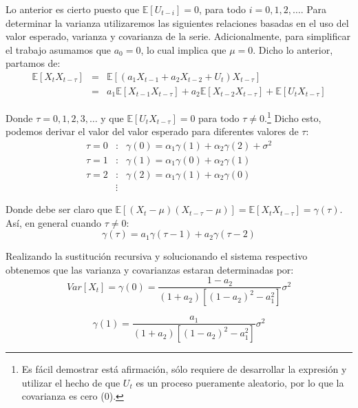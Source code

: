 \documentclass[
]{book}
\begin{document}
Lo anterior es cierto puesto que \(\mathbb{E}[U_{t - i}] = 0\), para todo \(i = 0, 1, 2, \ldots\). Para determinar la varianza utilizaremos las siguientes relaciones basadas en el uso del valor esperado, varianza y covarianza de la serie. Adicionalmente, para simplificar el trabajo asumamos que \(a_0 = 0\), lo cual implica que \(\mu = 0\). Dicho lo anterior, partamos de:
\begin{eqnarray*}
    \mathbb{E}[X_t X_{t - \tau}] & = & \mathbb{E}[(a_1 X_{t-1} + a_2 X_{t-2} + U_t) X_{t - \tau}]\\
    & = & a_1 \mathbb{E}[X_{t - 1} X_{t - \tau}] + a_2 \mathbb{E}[X_{t - 2} X_{t - \tau}] + \mathbb{E}[U_{t} X_{t - \tau}]
\end{eqnarray*}

Donde \(\tau = 0, 1, 2, 3, \ldots\) y que \(\mathbb{E}[U_{t} X_{t - \tau}] = 0\) para todo \(\tau \neq 0\).\footnote{ Es fácil demostrar está afirmación, sólo requiere de desarrollar la expresión y utilizar el hecho de que $U_t$ es un proceso pueramente aleatorio, por lo que la covarianza es cero (0).} Dicho esto, podemos derivar el valor del valor esperado para diferentes valores de \(\tau\):
\begin{eqnarray*}
    \tau = 0 & : & \gamma(0) = \alpha_1 \gamma(1) + \alpha_2 \gamma(2) + \sigma^2 \\
    \tau = 1 & : & \gamma(1) = \alpha_1 \gamma(0) + \alpha_2 \gamma(1) \\
    \tau = 2 & : & \gamma(2) = \alpha_1 \gamma(1) + \alpha_2 \gamma(0) \\
    & \vdots & 
\end{eqnarray*}

Donde debe ser claro que \(\mathbb{E}[(X_{t} - \mu)(X_{t - \tau} - \mu)] = \mathbb{E}[X_{t} X_{t - \tau}] = \gamma(\tau)\). Así, en general cuando \(\tau \neq 0\):
\begin{equation}    
    \gamma(\tau) = a_1 \gamma(\tau - 1) + a_2 \gamma(\tau - 2)
\end{equation}

Realizando la sustitución recursiva y solucionando el sistema respectivo obtenemos que las varianza y covarianzas estaran determinadas por:
\begin{equation}
    Var[X_t] = \gamma(0) = \frac{1 - a_2}{(1 + a_2)[(1 - a_2)^2 - a^2_1]} \sigma^2
\end{equation}

\begin{equation}
    \gamma(1) = \frac{a_1}{(1 + a_2)[(1 - a_2)^2 - a^2_1]} \sigma^2
\end{equation}
\end{document}
